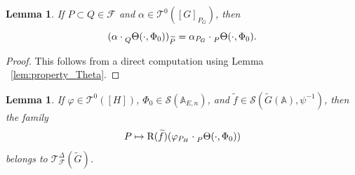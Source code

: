 \documentclass[letterpaper,11pt]{amsart}
\newcommand{\bA}{\mathbb{A}}
\newcommand{\cF}{\mathcal{F}}
\newcommand{\cS}{\mathcal{S}}
\newcommand{\cT}{\mathcal{T}}
\newcommand{\<}{\negthickspace}
\theoremstyle{definition}
\theoremstyle{plain}
\newtheorem{lemma}[definition]{Lemma}
\theoremstyle{remark}
\numberwithin{equation}{section}
\begin{document}
\begin{lemma}   \label{lemma:constant_term_measure_product_group}
If $P \subset Q \in \cF$ and $\alpha \in \cT^0([G]_{P_G})$,
then
    \[
    (\alpha \cdot \prescript{}{Q}{\Theta}(\cdot, \Phi_0))_{\widetilde{P}}
    = \alpha_{P_G}\cdot \prescript{}{P}{\Theta}(\cdot, \Phi_0).
    \]
\end{lemma}

\begin{proof}
This follows from a direct computation using Lemma ~\ref{lem:property_Theta}.
\end{proof}

\begin{lemma} \label{lem:smoothed_constant_term}
If $\varphi \in \cT^0([H])$, $\Phi_0 \in \cS(\bA_{E, n})$, and $\widetilde{f}
\in \cS(\widetilde{G}(\bA),\psi^{-1})$, then the family
    \[
    P \mapsto \mathrm{R}(\widetilde{f})(\varphi_{P_{H}} \cdot
    \prescript{}{P}{\Theta}(\cdot, \Phi_0))
    \]
belongs to $\cT^{\Delta}_{\cF}(\widetilde{G})$.
\end{lemma}
\end{document}
